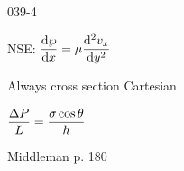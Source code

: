 \begin{mitframe}{039-4}

            
 \begin{listone}
 
 \item NSE: $\dfrac{\mathrm{d}\dynpress}{\mathrm{d}\disp}=\chempot\dfrac{\mathrm{d}^2\vvel_{\disp}}{\mathrm{d}y^2}$
 
 			\begin{listtwo}
            
            \item Always cross section Cartesian
            
            \item $\dfrac{\iipf\p}{\length}=\dfrac{\surftens\cos\theta}{\heattranscoeff}$


			\item Middleman p. 180
\end{listtwo}

\end{listone}

\end{mitframe}